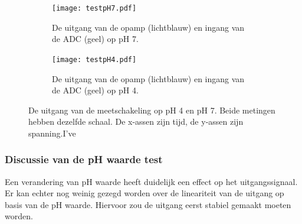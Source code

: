 \begin{figure}[!htbp]
    \centering
    \begin{subfigure}[b]{0.49\textwidth}
        \centering
        \texttt{[image: testpH7.pdf]}
        \caption{De uitgang van de opamp (lichtblauw) en ingang van de ADC (geel) op pH 7.}
        \label{fig:resultpH7}
    \end{subfigure}
    \hfill
    \begin{subfigure}[b]{0.49\textwidth}
        \centering
        \texttt{[image: testpH4.pdf]}
        \caption{De uitgang van de opamp (lichtblauw) en ingang van de ADC (geel) op pH 4.}
        \label{fig:resultpH4}
    \end{subfigure}
    \caption{De uitgang van de meetschakeling op pH 4 en pH 7. Beide metingen hebben dezelfde schaal. De x-assen zijn tijd, de y-assen zijn spanning.I've }
    \label{fig:resultspHMeasure}
\end{figure}

\subsubsection{Discussie van de pH waarde test}
Een verandering van pH waarde heeft duidelijk een effect op het uitgangssignaal. Er kan echter nog weinig gezegd worden over de lineariteit van de uitgang op basis van de pH waarde. Hiervoor zou de uitgang eerst stabiel gemaakt moeten worden.




